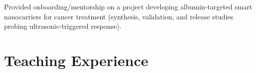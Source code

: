 \documentclass[letterpaper,11pt]{article}
\begin{document}

\begin{menteeitems}
\item Provided onboarding/mentorship on a project developing albumin-targeted smart nanocarriers for cancer treatment (synthesis, validation, and release studies probing ultrasonic-triggered response).
\end{menteeitems}

\vspace{-0.5\baselineskip}
\section*{Teaching Experience}
\end{document}
